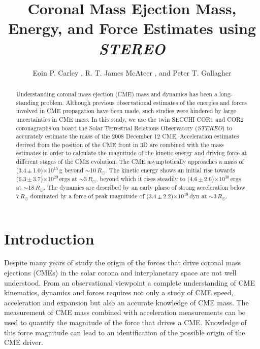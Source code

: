 \documentclass{emulateapj}
\begin{document}

\title{Coronal Mass Ejection Mass, Energy, and Force Estimates using \emph{STEREO}}

\author{Eoin P. Carley , R. T. James McAteer  , and Peter  T. Gallagher  }

\begin{abstract}
Understanding coronal mass ejection (CME) mass and dynamics has been a long-standing problem. Although previous observational estimates of the energies and forces involved in CME propagation have been made, such studies were hindered by large uncertainties in CME mass.
In this study, we use the twin SECCHI COR1 and COR2 coronagraphs on board the Solar Terrestrial Relations Observatory (\emph{STEREO}) to accurately estimate the mass of the 2008 December 12 CME. Acceleration estimates derived from the position of the CME front in 3D are combined with the mass estimates in order to calculate the magnitude of the kinetic energy and driving force at different stages of the CME evolution.
The CME asymptotically approaches a mass of (3.4\,$\pm$\,1.0)$\times$10$^{15}$\,g beyond $\sim$10\,$R_{\odot}$. 
The kinetic energy shows an initial rise towards (6.3\,$\pm$\,3.7)$\times$10$^{29}$\,ergs at $\sim$3\,$R_{\odot}$, beyond which it rises steadily to (4.6\,$\pm$\,2.6)$\times$10$^{30}$\,ergs at $\sim$18\,$R_{\odot}$.
The dynamics are described by an early phase of strong acceleration below 7\,$R_{\odot}$ dominated by a force of peak magnitude of (3.4\,$\pm$\,2.2)$\times$10$^{19}$\,dyn at $\sim$3\,$R_{\odot}$. 

\end{abstract}




\section{Introduction}
Despite many years of study the origin of the forces that drive coronal mass ejections (CMEs) in the solar corona and interplanetary space are not well understood. 
From an observational viewpoint a complete understanding of CME kinematics, dynamics and forces requires not only a study of CME speed, acceleration and expansion but also an accurate knowledge of CME mass.  The measurement of CME mass combined with acceleration measurements can be used to quantify the magnitude of the force that drives a CME. Knowledge of this force magnitude can lead to an identification of the possible origin of the CME driver. 
\end{document}
